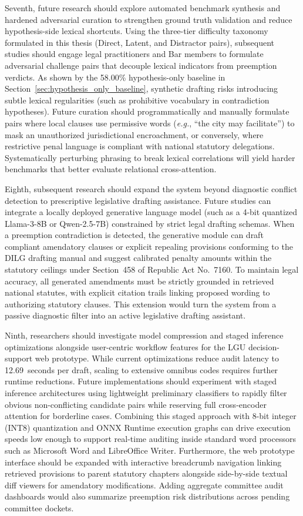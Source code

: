 Seventh, future research should explore automated benchmark synthesis and hardened adversarial curation to strengthen ground truth validation and reduce hypothesis-side lexical shortcuts. Using the three-tier difficulty taxonomy formulated in this thesis (Direct, Latent, and Distractor pairs), subsequent studies should engage legal practitioners and Bar members to formulate adversarial challenge pairs that decouple lexical indicators from preemption verdicts. As shown by the 58.00\% hypothesis-only baseline in Section~\ref{sec:hypothesis_only_baseline}, synthetic drafting risks introducing subtle lexical regularities (such as prohibitive vocabulary in contradiction hypotheses). Future curation should programmatically and manually formulate pairs where local clauses use permissive words (\textit{e.g.}, ``the city may facilitate'') to mask an unauthorized jurisdictional encroachment, or conversely, where restrictive penal language is compliant with national statutory delegations. Systematically perturbing phrasing to break lexical correlations will yield harder benchmarks that better evaluate relational cross-attention.

Eighth, subsequent research should expand the system beyond diagnostic conflict detection to prescriptive legislative drafting assistance. Future studies can integrate a locally deployed generative language model (such as a 4-bit quantized Llama-3-8B or Qwen-2.5-7B) constrained by strict legal drafting schemas. When a preemption contradiction is detected, the generative module can draft compliant amendatory clauses or explicit repealing provisions conforming to the DILG drafting manual and suggest calibrated penalty amounts within the statutory ceilings under Section~458 of Republic Act No.~7160. To maintain legal accuracy, all generated amendments must be strictly grounded in retrieved national statutes, with explicit citation trails linking proposed wording to authorizing statutory clauses. This extension would turn the system from a passive diagnostic filter into an active legislative drafting assistant.

Ninth, researchers should investigate model compression and staged inference optimizations alongside user-centric workflow features for the LGU decision-support web prototype. While current optimizations reduce audit latency to 12.69~seconds per draft, scaling to extensive omnibus codes requires further runtime reductions. Future implementations should experiment with staged inference architectures using lightweight preliminary classifiers to rapidly filter obvious non-conflicting candidate pairs while reserving full cross-encoder attention for borderline cases. Combining this staged approach with 8-bit integer (INT8) quantization and ONNX Runtime execution graphs can drive execution speeds low enough to support real-time auditing inside standard word processors such as Microsoft Word and LibreOffice Writer. Furthermore, the web prototype interface should be expanded with interactive breadcrumb navigation linking retrieved provisions to parent statutory chapters alongside side-by-side textual diff viewers for amendatory modifications. Adding aggregate committee audit dashboards would also summarize preemption risk distributions across pending committee dockets.

